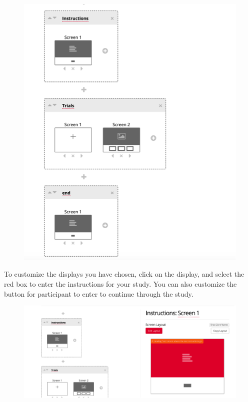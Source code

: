 \documentclass[]{book}
\begin{document}
\begin{figure}
\centering
\includegraphics{images/research_protocols/gorilla/gorilla18.png}
\caption{}
\end{figure}

To customize the displays you have chosen, click on the display, and select the red box to enter the instructions for your study. You can also customize the button for participant to enter to continue through the study.

\begin{figure}
\centering
\includegraphics{images/research_protocols/gorilla/gorilla19.png}
\caption{}
\end{figure}
\end{document}
